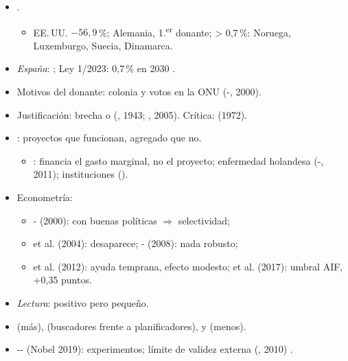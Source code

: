 \documentclass{article}
\begin{document}
\begin{columnas}
\begin{itemize}
\item {}.
  \begin{itemize}
  \item EE.\,UU. $-56{,}9$\,\%; Alemania, 1.\textsuperscript{er} donante; > 0,7\,\%: Noruega, Luxemburgo, Suecia, Dinamarca.
  \end{itemize}
\item \emph{España}: ; Ley 1/2023: 0,7\,\% en 2030 .
\end{itemize}
\begin{itemize}
\item Motivos del donante: colonia y votos en la ONU (-, 2000).
\item Justificación: brecha o  (, 1943; , 2005). Crítica:  (1972).
\end{itemize}
\begin{itemize}
\item {}: proyectos que funcionan, agregado que no.
  \begin{itemize}
  \item {}: financia el gasto marginal, no el proyecto; enfermedad holandesa (-, 2011); instituciones ().
  \end{itemize}
\item Econometría:
  \begin{itemize}
  \item {}- (2000): con buenas políticas $\Rightarrow$ selectividad;
  \item {} et al. (2004): desaparece; - (2008): nada robusto;
  \item {} et al. (2012): ayuda temprana, efecto modesto;  et al. (2017): umbral AIF, +0,35 puntos.
  \end{itemize}
\item \emph{Lectura}: positivo pero pequeño.
\end{itemize}
\begin{itemize}
\item {} (más),  (buscadores frente a planificadores),  y  (menos).
\item {}-- (Nobel 2019): experimentos; límite de validez externa (, 2010) .
\end{itemize}


\end{columnas}
\end{document}

